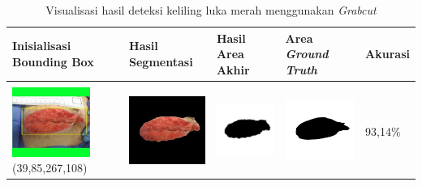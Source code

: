 \begin{table}[H]
	\centering
	\caption{Visualisasi hasil deteksi keliling luka merah menggunakan \emph{Grabcut}}
	\label{tabel_hasil_14}
	\begin{tabular}{|m{1.0in}|m{1.0in}|m{1.0in}|m{1.0in}|m{0.6in}|}
		\hline
		\textbf{Inisialisasi Bounding Box} & \textbf{Hasil Segmentasi} & \textbf{Hasil Area Akhir} & \textbf{Area \emph{Ground Truth}} & \textbf{Akurasi} \\
		\hline
		&  &  & \\
		\includegraphics[width=1.0in]{gambar/hasil_segmentasi/luka_merah/image_19_rect.jpg} {\centering\fontsize{10}{10}\selectfont(39,85,267,108)}&
		\includegraphics[width=1.0in]{gambar/hasil_segmentasi/luka_merah/result_19.jpg}&
		\includegraphics[width=1.0in]{gambar/hasil_segmentasi/luka_merah/mask_r_19.jpg}&
		\includegraphics[width=1.0in]{gambar/hasil_segmentasi/luka_merah/19_r.jpg}&
		93,14\% \\
		\hline


\end{tabular}
\end{table}
